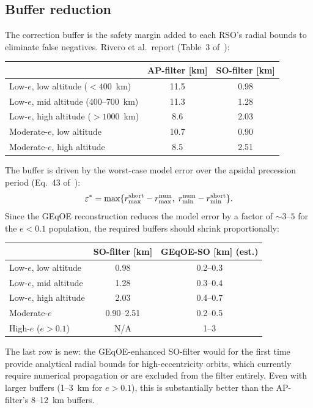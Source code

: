 \documentclass[11pt]{article}
\begin{document}
\subsection{Buffer reduction}
\label{sec:buffer}

The correction buffer is the safety margin added to each RSO's radial bounds
to eliminate false negatives. Rivero et al.\ report (Table~3
of~\cite{rivero2025}):
\begin{center}
\begin{tabular}{lcc}
\toprule
& AP-filter [km] & SO-filter [km] \\
\midrule
Low-$e$, low altitude ($< 400$~km) & 11.5 & 0.98 \\
Low-$e$, mid altitude (400--700~km) & 11.3 & 1.28 \\
Low-$e$, high altitude ($> 1000$~km) & 8.6 & 2.03 \\
Moderate-$e$, low altitude & 10.7 & 0.90 \\
Moderate-$e$, high altitude & 8.5 & 2.51 \\
\bottomrule
\end{tabular}
\end{center}

The buffer is driven by the worst-case model error over the apsidal
precession period (Eq.~43 of~\cite{rivero2025}):
\begin{equation}
\varepsilon^* = \max\{r^{\rm short}_{\max} - r^{\rm num}_{\max},\;
r^{\rm num}_{\min} - r^{\rm short}_{\min}\}.
\end{equation}
Since the GEqOE reconstruction reduces the model error by a factor of
$\sim\!3$--$5$ for the $e < 0.1$ population, the required buffers should
shrink proportionally:
\begin{center}
\begin{tabular}{lcc}
\toprule
& SO-filter [km] & GEqOE-SO [km] (est.) \\
\midrule
Low-$e$, low altitude & 0.98 & 0.2--0.3 \\
Low-$e$, mid altitude & 1.28 & 0.3--0.4 \\
Low-$e$, high altitude & 2.03 & 0.4--0.7 \\
Moderate-$e$ & 0.90--2.51 & 0.2--0.5 \\
High-$e$ ($e > 0.1$) & N/A & 1--3 \\
\bottomrule
\end{tabular}
\end{center}

The last row is new: the GEqOE-enhanced SO-filter would for the first time
provide analytical radial bounds for high-eccentricity orbits, which
currently require numerical propagation or are excluded from the filter
entirely. Even with larger buffers (1--3~km for $e > 0.1$), this is
substantially better than the AP-filter's 8--12~km buffers.
\end{document}
